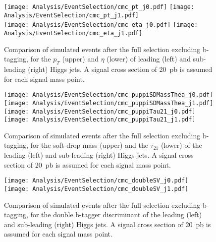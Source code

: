 \begin{figure}[h!]
\centering
\texttt{[image: Analysis/EventSelection/cmc\_pt\_j0.pdf]}
\texttt{[image: Analysis/EventSelection/cmc\_pt\_j1.pdf]} \\
\texttt{[image: Analysis/EventSelection/cmc\_eta\_j0.pdf]}
\texttt{[image: Analysis/EventSelection/cmc\_eta\_j1.pdf]}
\caption{ Comparison of simulated events after the full selection excluding b-tagging, for the $p_{T}$ (upper) and $\eta$ (lower) of  leading (left) and sub-leading (right) Higgs jets. A signal cross section of 20~pb is assumed for each signal mass point. \label{fig:higgsjet_prebtag}
}

\end{figure}
\begin{figure}[h!]
\centering
\texttt{[image: Analysis/EventSelection/cmc\_puppiSDMassThea\_j0.pdf]}
\texttt{[image: Analysis/EventSelection/cmc\_puppiSDMassThea\_j1.pdf]} \\
\texttt{[image: Analysis/EventSelection/cmc\_puppiTau21\_j0.pdf]}
\texttt{[image: Analysis/EventSelection/cmc\_puppiTau21\_j1.pdf]}
\caption{ Comparison of simulated events after the full selection excluding b-tagging, for the soft-drop mass (upper)  and the $\tau_{21}$ (lower) of the leading (left) and sub-leading (right) Higgs jets.  A signal cross section of 20~pb is assumed for each signal mass point. \label{fig:uncorrsd_prebtag}
}
\end{figure}

\begin{figure}[h!]
\centering
\texttt{[image: Analysis/EventSelection/cmc\_doubleSV\_j0.pdf]}
\texttt{[image: Analysis/EventSelection/cmc\_doubleSV\_j1.pdf]}
\caption{ Comparison of simulated events after the full selection excluding b-tagging, for the double b-tagger discriminant   of the leading (left) and sub-leading (right) Higgs jets. A signal cross section of 20~pb is assumed for each signal mass point. \label{fig:doublesv_prebtag}
}
\end{figure}


